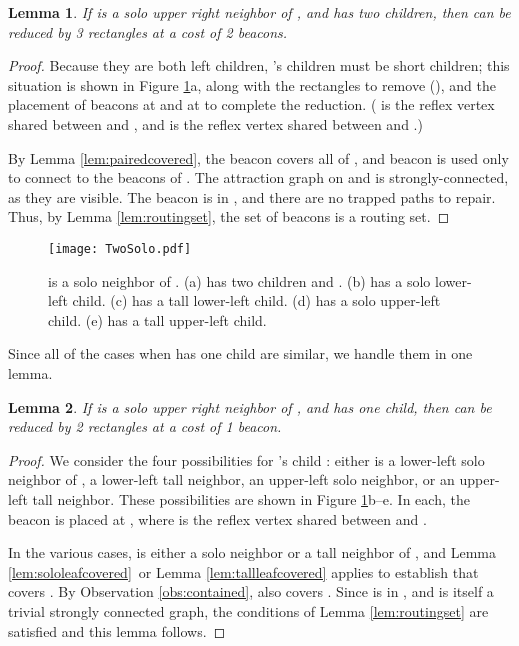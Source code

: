 \documentclass{article}
\newtheorem{lemma}{Lemma}
\begin{document}
		\begin{lemma}\label{lem:twosolotwo}
			If  is a solo upper right neighbor of , and  has two children,
			then  can be reduced by 3 rectangles at a cost of 2 beacons.
		\end{lemma}
		\begin{proof}
			Because they are both left children, 's children must be short children; 
			this situation is shown in Figure
			\ref{fig:twosolo}a, along with the rectangles to remove (), and the 
			placement of beacons  at  and  at  to complete the reduction.
			( is the reflex vertex shared between  and , 
			and  is the reflex vertex shared between  and .)
			
			By Lemma \ref{lem:pairedcovered}, the beacon  covers all of , and
			beacon  is used only to connect  to
			the beacons of .
			The attraction graph on  and  is strongly-connected,
			as they are visible.
			The beacon  is in , and there are no trapped paths to repair.
			Thus, by Lemma \ref{lem:routingset}, the set of beacons  is a routing set.
		\end{proof}
		
		\begin{figure}[htbp] 
			\begin{center}
				\texttt{[image: TwoSolo.pdf]} 
			\end{center}
			\caption{ 
				 is a solo neighbor of .
				(a)  has two children  and .
				(b)  has a solo lower-left child. 
				(c)  has a tall lower-left child.
				(d)  has a solo upper-left child. 
				(e)  has a tall upper-left child.
			}
			\label{fig:twosolo}
		\end{figure}

		Since all of the cases when  has one child are similar, we handle them in
		one lemma.
		
		\begin{lemma}\label{lem:twosoloone}
			If  is a solo upper right neighbor of , and  has one child,
			then  can be reduced by 2 rectangles at a cost of 1 beacon.
		\end{lemma}
		\begin{proof}
			We consider the four possibilities for 's child :
			either  is a lower-left solo neighbor of ,
			a lower-left tall neighbor,
			an upper-left solo neighbor,
			or an upper-left tall neighbor.
			These possibilities are shown in Figure \ref{fig:twosolo}b--e.
			In each, the beacon  is placed at , where
			 is the reflex vertex shared
			between  and .
			
			In the various cases,  is either a solo neighbor or a tall neighbor of
			, and Lemma \ref{lem:sololeafcovered}\ or Lemma
			\ref{lem:tallleafcovered} applies to establish that  covers .
			By Observation \ref{obs:contained},  also covers .
			Since  is in , and is itself a trivial
			strongly connected graph, the conditions of Lemma \ref{lem:routingset} are
			satisfied and this lemma follows.
		\end{proof} 
\end{document}
